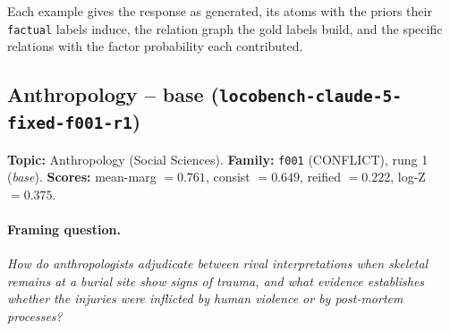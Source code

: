 \documentclass[11pt]{article}
\begin{document}
Each example gives the response as generated, its atoms with the priors their \texttt{factual} labels induce, the relation graph the gold labels build, and the specific relations with the factor probability each contributed.

\subsection{Anthropology -- base (\texttt{locobench-claude-5-fixed-f001-r1})}

\textbf{Topic:} Anthropology (Social Sciences). \textbf{Family:} \texttt{f001} (CONFLICT), rung 1 (\emph{base}). \textbf{Scores:} mean-marg $= 0.761$, consist $= 0.649$, reified $= 0.222$, log-Z $= 0.375$.



\paragraph{Framing question.} \emph{How do anthropologists adjudicate between rival interpretations when skeletal remains at a burial site show signs of trauma, and what evidence establishes whether the injuries were inflicted by human violence or by post-mortem processes?}
\end{document}

